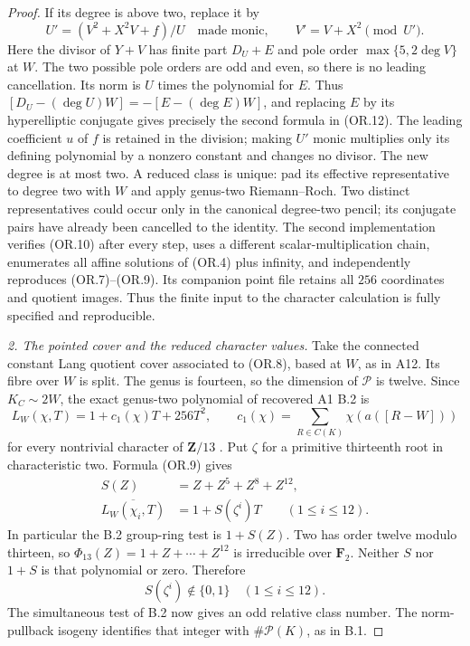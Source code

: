 \documentclass[11pt,a4paper]{article}
\begin{document}
\begin{proof}
If its degree is above two, replace it by
\[
     U'=(V^2+X^2V+f)/U\quad\text{made monic},\qquad
     V'=V+X^2\pmod{U'}.
 \tag{OR.12}
\]
Here the divisor of $Y+V$ has finite part $D_U+E$ and pole
order $\max\{5,2\deg V\}$ at $W$.  The two possible pole
orders are odd and even, so there is no leading cancellation.
Its norm is $U$ times the polynomial for $E$.  Thus
$[D_U-(\deg U)W]=-[E-(\deg E)W]$, and replacing $E$ by its
hyperelliptic conjugate gives precisely the second formula in
(OR.12).  The leading coefficient $u$ of $f$ is retained in
the division; making $U'$ monic multiplies only its defining
polynomial by a nonzero constant and changes no divisor.
The new degree is at most two.  A reduced class is unique:
pad its effective representative to degree two with $W$ and
apply genus-two Riemann--Roch.  Two distinct representatives
could occur only in the canonical degree-two pencil; its
conjugate pairs have already been cancelled to the identity.
The second implementation verifies (OR.10) after every step,
uses a different scalar-multiplication chain, enumerates all
affine solutions of (OR.4) plus infinity, and independently
reproduces (OR.7)--(OR.9).  Its companion point file retains all
$256$ coordinates and quotient images.  Thus the finite input
to the character calculation is fully specified and reproducible.

\emph{2. The pointed cover and the reduced character values.}
Take the connected constant Lang quotient cover associated to
(OR.8), based at $W$, as in A12.  Its fibre over $W$ is split.
The genus is fourteen, so the dimension of $\mathcal P$ is twelve.
Since $K_C\sim2W$, the exact genus-two polynomial of recovered
A1 B.2 is
\[
 L_W(\chi,T)=1+c_1(\chi)T+256T^2,
 \qquad
 c_1(\chi)=\sum_{R\in C(K)}\chi(a([R-W]))
 \tag{OR.13}
\]
for every nontrivial character of $\mathbf Z/13$
\cite[B.2]{A1run}.  Put $\zeta$ for a primitive thirteenth root
in characteristic two.  Formula (OR.9) gives
\[
 \begin{aligned}
 S(Z)&=Z+Z^5+Z^8+Z^{12},\\
 \overline{L_W(\chi_i,T)}&=1+S(\zeta^i)T
                         \qquad(1\le i\le12).
 \end{aligned}
 \tag{OR.14}
\]
In particular the B.2 group-ring test is $1+S(Z)$.
Two has order twelve modulo thirteen, so
$\Phi_{13}(Z)=1+Z+\cdots+Z^{12}$ is irreducible over
$\mathbf F_2$.  Neither $S$ nor $1+S$ is that polynomial or
zero.  Therefore
\[
                        S(\zeta^i)\notin\{0,1\}
                           \quad(1\le i\le12).
 \tag{OR.15}
\]
The simultaneous test of B.2 now gives an odd relative class
number.  The norm-pullback isogeny identifies that integer with
$\#\mathcal P(K)$, as in B.1.


\end{proof}
\end{document}
